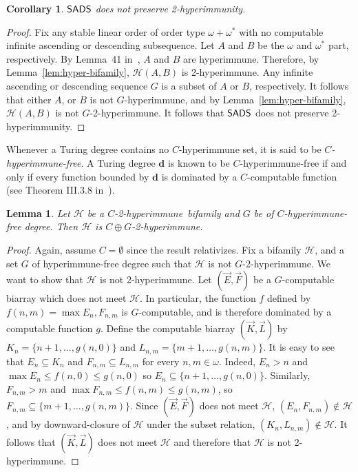 \documentclass{amsart}
\newtheorem{lemma}[theorem]{Lemma}
\newtheorem{corollary}[theorem]{Corollary}
\theoremstyle{definition}
\theoremstyle{remark}
\numberwithin{equation}{section}
\theoremstyle{noparens}
\def\propertyL{2-hyperimmunity}
\def\hyper{2-hyperimmune}
\newcommand{\Hcal}{\mathcal{H}}
\newcommand{\s}[1]{\ensuremath{\sf{#1}}}
\DeclareMathOperator{\sads}{\s{SADS}}
\begin{document}
\begin{corollary}
$\sads$ does not preserve \propertyL.
\end{corollary}
\begin{proof}
Fix any stable linear order of order type $\omega + \omega^{*}$
with no computable infinite ascending or descending subsequence.
Let $A$ and $B$ be the $\omega$ and $\omega^{*}$ part, respectively.
By Lemma~41 in~\cite{Patey2016Partial}, $A$ and $B$ are hyperimmune.
Therefore, by Lemma~\ref{lem:hyper-bifamily}, $\Hcal(A, B)$ is \hyper.
Any infinite ascending or descending sequence $G$ is a subset of $A$
or $B$, respectively. It follows that either $A$, or $B$ is not $G$-hyperimmune,
and by Lemma~\ref{lem:hyper-bifamily}, $\Hcal(A, B)$ is not $G$-\hyper.
It follows that $\sads$ does not preserve \propertyL.
\end{proof}

Whenever a Turing degree contains no $C$-hyperimmune set, it is said to be
\emph{$C$-hyperimmune-free}.
A Turing degree $\mathbf{d}$ is known to be $C$-hyperimmune-free if and only if
every function bounded by $\mathbf{d}$ is dominated by a $C$-computable function
(see Theorem III.3.8 in~\cite{Odifreddi1992Classical}).

\begin{lemma}\label{lem:hif-double-immune}
Let $\Hcal$ be a $C$-\hyper\ bifamily and $G$ be of $C$-hyperimmune-free degree.
Then $\Hcal$ is $C \oplus G$-\hyper.
\end{lemma}
\begin{proof}
Again, assume $C=\emptyset$ since the result relativizes.
Fix a bifamily $\Hcal$, and a set $G$ of hyperimmune-free degree
such that $\Hcal$ is not $ G$-\hyper. We want to show that $\Hcal$ is not \hyper.
Let $(\vec{E}, \vec{F})$ be a $ G$-computable biarray which does not meet $\Hcal$.
In particular, the function $f$ defined by $f(n, m) = \max E_n, F_{n,m}$ is $G$-computable,
and is therefore dominated by a computable function $g$.
Define the computable biarray $(\vec{K}, \vec{L})$ by $K_n = \{n+1, \dots, g(n, 0) \}$
and $L_{n,m} = \{m+1, \dots, g(n, m) \}$. It is easy to see that $E_n \subseteq K_n$
and $F_{n,m} \subseteq L_{n,m}$ for every $n, m \in \omega$. Indeed, $E_n > n$ and $\max E_n \leq f(n, 0) \leq g(n,0)$
so $E_n \subseteq \{n+1, \dots, g(n, 0) \}$. Similarly, $F_{n,m} > m$ and $\max F_{n,m} \leq f(n,m) \leq g(n,m)$,
so $F_{n,m} \subseteq \{m+1, \dots, g(n, m)\}$. Since $(\vec{E}, \vec{F})$ does not meet $\Hcal$,
$(E_n, F_{n,m}) \not \in \Hcal$, and by downward-closure of $\Hcal$
under the subset relation, $(K_n, L_{n,m}) \not \in \Hcal$. It follows that $(\vec{K}, \vec{L})$ does not meet $\Hcal$
and therefore that $\Hcal$ is not \hyper.
\end{proof}
\end{document}
